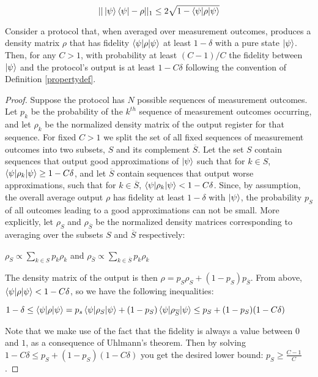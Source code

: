 \documentclass[12pt]{dalthesis}
\begin{document}
\begin{equation}
\label{Fuchs2}
||\ket{\psi} \bra{\psi} - \rho ||_1 \leq 2\sqrt{1 - \braket{\psi | \rho | \psi}}
\end{equation}

\begin{lemma}
\label{lemma5.4}
Consider a protocol that, when averaged over measurement outcomes, produces a density matrix $\rho$ that has fidelity $\braket{\psi | \rho | \psi}$ at least $1 - \delta$ with a pure state $\ket{\psi}$. Then, for any $C > 1$, with probability at least $(C-1)/C$ the fidelity between $\ket{\psi}$ and the protocol's output is at least $1 - C\delta$ following the convention of Definition \ref{propertydef}.
\end{lemma}

\begin{proof}
Suppose the protocol has $N$ possible sequences of measurement outcomes. Let $p_k$ be the probability of the $k^{th}$ sequence of measurement outcomes occurring, and let $\rho_k$ be the normalized density matrix of the output register for that sequence.
For fixed $C > 1$ we split the set of all fixed sequences of measurement outcomes into two subsets, $S$ and its complement $\overline{S}$. Let the set $S$ contain sequences that output good approximations of $\ket{\psi}$ such that for $k \in S$, $\braket{\psi | \rho_k | \psi} \geq 1 - C \delta$, and let $\overline{S}$ contain sequences that output worse approximations, such that for $k \in \overline{S}$, $\braket{\psi | \rho_k | \psi} < 1 - C \delta$. Since, by assumption, the overall average output $\rho$ has fidelity at least $1 - \delta$ with $\ket{\psi}$, the probability $p_S$ of all outcomes leading to a good approximations can not be small. More explicitly, let $\rho_S$ and $\rho_{\overline{S}}$ be the normalized density matrices corresponding to averaging over the subsets $S$ and $\overline{S}$ respectively:
\begin{center}
$\rho_S \propto \sum\limits_{k \in S} p_k \rho_k$ and $\rho_{\overline{S}} \propto \sum\limits_{k \in \overline{S}} p_k \rho_k$
\end{center}
The density matrix of the output is then $\rho = p_S \rho_S + (1 - p_S)p_{\overline{S}}$. From above, $\braket{\psi | \rho | \psi} < 1 - C \delta$, so we have the following inequalities:
\begin{center}
$1 - \delta \leq \braket{\psi | \rho | \psi} = p_s \braket{\psi | \rho_S | \psi} + (1 - p_S) \braket{\psi | \rho_{\overline{S}} | \psi} \leq p_S + (1 - p_S)(1 - C \delta)$
\end{center}
Note that we make use of the fact that the fidelity is always a value between $0$ and $1$, as a consequence of Uhlmann's theorem. Then by solving $1 - C \delta \leq p_S + (1 - p_S)(1 - C \delta)$ you get the desired lower bound: $p_S \geq \frac{C-1}{C}$.


\end{proof}
\end{document}
